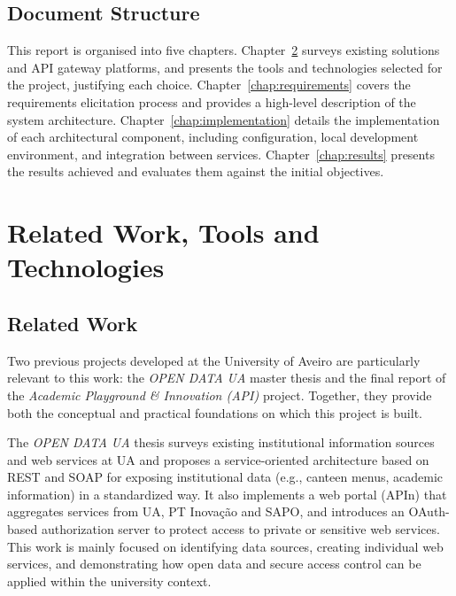 \documentclass[12pt, a4paper]{report}
\begin{document}
\section{Document Structure}
This report is organised into five chapters. Chapter~\ref{chap:related_work} surveys
existing solutions and API gateway platforms, and presents the tools and technologies
selected for the project, justifying each choice. Chapter~\ref{chap:requirements}
covers the requirements elicitation process and provides a high-level description of
the system architecture. Chapter~\ref{chap:implementation} details the implementation
of each architectural component, including configuration, local development environment,
and integration between services. Chapter~\ref{chap:results} presents the results
achieved and evaluates them against the initial objectives.

\chapter{Related Work, Tools and Technologies}
\label{chap:related_work}

\section{Related Work}

Two previous projects developed at the University of Aveiro are particularly
relevant to this work: the \emph{OPEN DATA UA} master thesis
and the final report of the \emph{Academic Playground \& Innovation (API)}
project. Together, they provide both the conceptual and
practical foundations on which this project is built.

The \emph{OPEN DATA UA} thesis surveys existing institutional information
sources and web services at UA and proposes a service-oriented architecture
based on REST and SOAP for exposing institutional data (e.g., canteen menus,
academic information) in a standardized way. It also implements a web
portal (APIn) that aggregates services from UA, PT Inovação and SAPO, and
introduces an OAuth-based authorization server to protect access to private or
sensitive web services. This work is mainly focused on identifying data
sources, creating individual web services, and demonstrating how open data and
secure access control can be applied within the university context.
\end{document}
